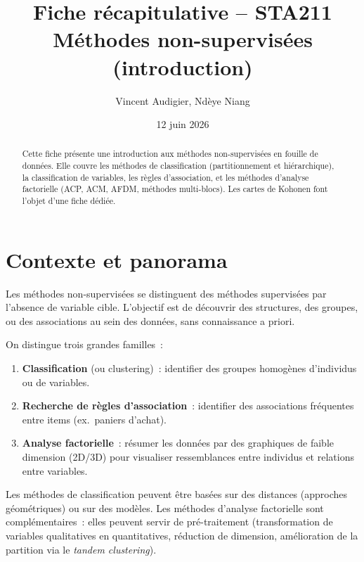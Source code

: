 \documentclass[a4paper,11pt]{article}
\title{\textbf{Fiche r\'ecapitulative -- STA211}\\[4pt]
\large M\'ethodes non-supervis\'ees (introduction)}
\author{Vincent Audigier, Nd\`eye Niang}
\date{12 juin 2026}
\theoremstyle{definition}
\theoremstyle{remark}
\begin{document}
\maketitle
\thispagestyle{empty}

\begin{abstract}
Cette fiche pr\'esente une introduction aux m\'ethodes non-supervis\'ees en
fouille de donn\'ees. Elle couvre les m\'ethodes de classification
(partitionnement et hi\'erarchique), la classification de variables, les
r\`egles d'association, et les m\'ethodes d'analyse factorielle (ACP, ACM,
AFDM, m\'ethodes multi-blocs). Les cartes de Kohonen font l'objet d'une
fiche d\'edi\'ee.
\end{abstract}

\vfill
\tableofcontents
\newpage

\section{Contexte et panorama}

Les m\'ethodes non-supervis\'ees se distinguent des m\'ethodes
supervis\'ees par l'absence de variable cible. L'objectif est de
d\'ecouvrir des structures, des groupes, ou des associations au sein
des donn\'ees, sans connaissance a priori.

On distingue trois grandes familles~:

\begin{enumerate}
  \item \textbf{Classification} (ou clustering)~: identifier des groupes
    homog\`enes d'individus ou de variables.
  \item \textbf{Recherche de r\`egles d'association}~: identifier des
    associations fr\'equentes entre items (ex.~paniers d'achat).
  \item \textbf{Analyse factorielle}~: r\'esumer les donn\'ees par des
    graphiques de faible dimension (2D/3D) pour visualiser ressemblances
    entre individus et relations entre variables.
\end{enumerate}

Les m\'ethodes de classification peuvent \^etre bas\'ees sur des
distances (approches g\'eom\'etriques) ou sur des mod\`eles.
Les m\'ethodes d'analyse factorielle sont compl\'ementaires~: elles
peuvent servir de pr\'e-traitement (transformation de variables
qualitatives en quantitatives, r\'eduction de dimension, am\'elioration
de la partition via le \emph{tandem clustering}).
\end{document}
